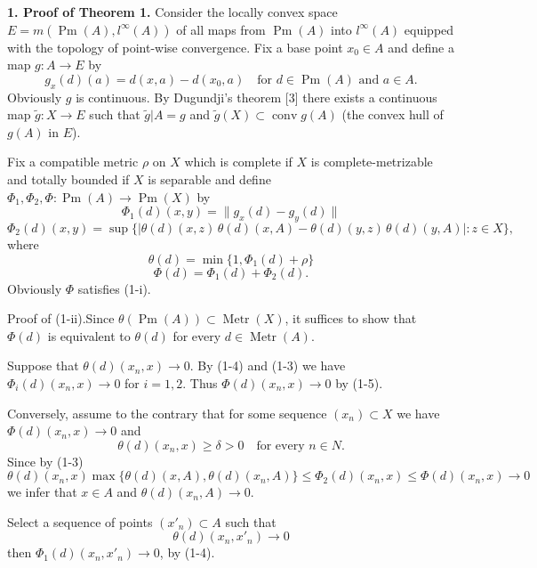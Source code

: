 \documentclass[11pt,a4paper,leqno,twoside]{article}
\newcommand{\Metr}{\operatorname{Metr}}
\newcommand{\Pm}{\operatorname{Pm}}
\newcommand{\conv}{\operatorname{conv}}
\newcommand{\norm}[1]{\lVert#1\rVert}
\newcommand{\restr}{\vert}
\newcommand{\proofpart}[1]{\par\medskip\noindent Proof of (#1).\enspace}
\begin{document}
\par\medskip\noindent\textbf{1. Proof of Theorem 1.} Consider the locally convex space $E=m(\Pm(A),l^\infty(A))$ of all maps from $\Pm(A)$ into $l^\infty(A)$ equipped with the topology of point-wise convergence. Fix a base point $x_0\in A$ and define a map $g:A\to E$ by
\begin{equation}\tag{1-1}
g_x(d)(a)=d(x,a)-d(x_0,a)\quad\text{for }d\in\Pm(A)\text{ and }a\in A.
\end{equation}
Obviously $g$ is continuous. By Dugundji's theorem [3] there exists a continuous map $\tilde g:X\to E$ such that $\tilde g\restr A=g$ and $\tilde g(X)\subset\conv g(A)$ (the convex hull of $g(A)$ in $E$).

Fix a compatible metric $\rho$ on $X$ which is complete if $X$ is complete-metrizable and totally bounded if $X$ is separable and define $\Phi_1,\Phi_2,\Phi:\Pm(A)\to\Pm(X)$ by
\begin{equation}\tag{1-2}
\Phi_1(d)(x,y)=\norm{g_x(d)-g_y(d)}
\end{equation}
\begin{equation}\tag{1-3}
\Phi_2(d)(x,y)=\sup\{|\theta(d)(x,z)\,\theta(d)(x,A)-\theta(d)(y,z)\,\theta(d)(y,A)|:z\in X\},
\end{equation}
where
\begin{equation}\tag{1-4}
\theta(d)=\min\{1,\Phi_1(d)+\rho\}
\end{equation}
\begin{equation}\tag{1-5}
\Phi(d)=\Phi_1(d)+\Phi_2(d).
\end{equation}
Obviously $\Phi$ satisfies (1-i).

\proofpart{1-ii}Since $\theta(\Pm(A))\subset\Metr(X)$, it suffices to show that $\Phi(d)$ is equivalent to $\theta(d)$ for every $d\in\Metr(A)$.

Suppose that $\theta(d)(x_n,x)\to0$. By (1-4) and (1-3) we have $\Phi_i(d)(x_n,x)\to0$ for $i=1,2$. Thus $\Phi(d)(x_n,x)\to0$ by (1-5).

\newpage %
Conversely, assume to the contrary that for some sequence $(x_n)\subset X$ we have $\Phi(d)(x_n,x)\to0$ and
\begin{equation}\tag{1-6}
\theta(d)(x_n,x)\geq\delta>0\quad\text{for every }n\in N.
\end{equation}
Since by (1-3)
\[
\theta(d)(x_n,x)\max\{\theta(d)(x,A),\theta(d)(x_n,A)\}\leq\Phi_2(d)(x_n,x)\leq\Phi(d)(x_n,x)\to0
\]
we infer that $x\in A$ and $\theta(d)(x_n,A)\to0$.

Select a sequence of points $(x'_n)\subset A$ such that
\begin{equation}\tag{1-7}
\theta(d)(x_n,x'_n)\to0
\end{equation}
then $\Phi_1(d)(x_n,x'_n)\to0$, by (1-4).
\end{document}
